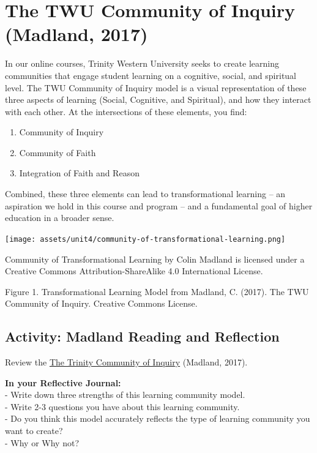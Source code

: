 \documentclass[
]{book}
\providecommand{\tightlist}{%
  \setlength{\itemsep}{0pt}\setlength{\parskip}{0pt}}
\begin{document}
\hypertarget{the-twu-community-of-inquiry-madland-2017}{%
\section{The TWU Community of Inquiry (Madland, 2017)}\label{the-twu-community-of-inquiry-madland-2017}}

In our online courses, Trinity Western University seeks to create learning communities that engage student learning on a cognitive, social, and spiritual level. The TWU Community of Inquiry model is a visual representation of these three aspects of learning (Social, Cognitive, and Spiritual), and how they interact with each other. At the intersections of these elements, you find:

\begin{enumerate}
\def\labelenumi{\arabic{enumi}.}
\tightlist
\item
  Community of Inquiry\\
\item
  Community of Faith\\
\item
  Integration of Faith and Reason
\end{enumerate}

Combined, these three elements can lead to transformational learning -- an aspiration we hold in this course and program -- and a fundamental goal of higher education in a broader sense.

\texttt{[image: assets/unit4/community-of-transformational-learning.png]}

{Community of Transformational Learning} by Colin Madland is licensed under a Creative Commons Attribution-ShareAlike 4.0 International License.

Figure 1. Transformational Learning Model from Madland, C. (2017). The TWU Community of Inquiry. Creative Commons
License.

\hypertarget{activity-madland-reading-and-reflection}{%
\subsection*{Activity: Madland Reading and Reflection}\label{activity-madland-reading-and-reflection}}

\begin{reflect}
Review the \href{assets/unit4/Madland-transformational-learning.pdf}{The
Trinity Community of Inquiry} (Madland, 2017).

\textbf{In your Reflective Journal:}\\
- Write down three strengths of this learning community model.\\
- Write 2-3 questions you have about this learning community.\\
- Do you think this model accurately reflects the type of learning
community you want to create?\\
- Why or Why not?
\end{reflect}
\end{document}
